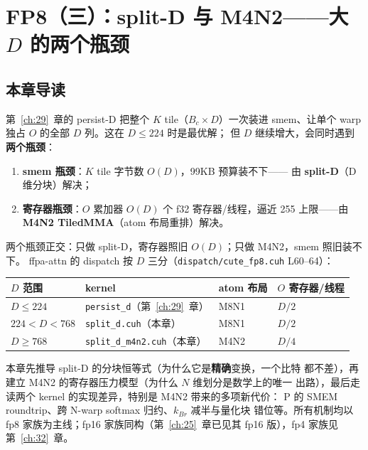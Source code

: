 \chapter{FP8（三）：split-D 与 M4N2——大 $D$ 的两个瓶颈}\label{ch:30}

\section{本章导读}

第~\ref{ch:29}~章的 persist-D 把整个 $K$ tile（$B_c\times D$）一次装进
smem、让单个 warp 独占 $O$ 的全部 $D$ 列。这在 $D\le 224$ 时是最优解；
但 $D$ 继续增大，会同时遇到\textbf{两个瓶颈}：

\begin{enumerate}[itemsep=0pt,topsep=2pt]
  \item \textbf{smem 瓶颈}：$K$ tile 字节数 $O(D)$，99KB 预算装不下——
        由 \textbf{split-D}（D 维分块）解决；
  \item \textbf{寄存器瓶颈}：$O$ 累加器 $O(D)$ 个 f32 寄存器/线程，逼近
        255 上限——由 \textbf{M4N2 TiledMMA}（atom 布局重排）解决。
\end{enumerate}

两个瓶颈正交：只做 split-D，寄存器照旧 $O(D)$；只做 M4N2，smem 照旧装不下。
ffpa-attn 的 dispatch 按 $D$ 三分（\texttt{dispatch/\allowbreak{}cute\_fp8.cuh}
L60--64）：

\begin{center}
\begin{tabular}{@{}llll@{}}
\toprule
$D$ 范围 & kernel & atom 布局 & $O$ 寄存器/线程 \\
\midrule
$D\le 224$ & \texttt{persist\_d}（第~\ref{ch:29}~章） & M8N1 & $D/2$ \\
$224<D<768$ & \texttt{split\_d.cuh}（本章） & M8N1 & $D/2$ \\
$D\ge 768$ & \texttt{split\_d\_m4n2.cuh}（本章） & M4N2 & $D/4$ \\
\bottomrule
\end{tabular}
\end{center}

本章先推导 split-D 的分块恒等式（为什么它是\textbf{精确}变换，一个比特
都不差），再建立 M4N2 的寄存器压力模型（为什么 $N$ 维划分是数学上的唯一
出路），最后走读两个 kernel 的实现差异，特别是 M4N2 带来的多项新代价：
P 的 SMEM roundtrip、跨 N-warp softmax 归约、$k_{Br}$ 减半与量化块
错位等。所有机制均以
fp8 家族为主线；fp16 家族同构（第~\ref{ch:25}~章已见其 fp16 版），fp4
家族见第~\ref{ch:32}~章。

